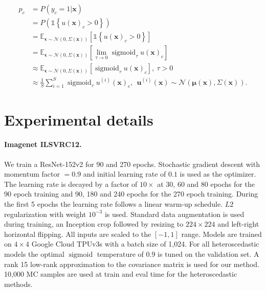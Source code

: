 \documentclass[final]{cvpr}
\DeclareMathOperator*{\sigmoid}{sigmoid}
\newcommand{\brac}[1]{\left[#1\right]}
\newcommand{\parencurly}[1]{\left\{#1\right\}}
\begin{document}
\begin{equation}
\begin{split}
    p_c &= P(y_c = 1 | \mathbf{x}) \\
    &= P(\mathds{1} \parencurly{u(\mathbf{x})_c > 0}) \\
    &= \mathbb{E}_{\boldsymbol{\epsilon} \sim \mathcal{N}(0, \Sigma(\mathbf{x}))} \brac{\mathds{1} \parencurly{u(\mathbf{x})_c > 0}} \\
    &= \mathbb{E}_{\boldsymbol{\epsilon} \sim \mathcal{N}(0, \Sigma(\mathbf{x}))} \brac{\lim_{\tau \to 0} \sigmoid_{\tau} u(\mathbf{x})_c} \\
    &\approx \mathbb{E}_{\boldsymbol{\epsilon} \sim \mathcal{N}(0, \Sigma(\mathbf{x}))} \brac{\sigmoid_{\tau} u(\mathbf{x})_c}, \ \tau > 0 \\
    &\approx \frac{1}{S} \sum_{i=1}^S \sigmoid_{\tau} u^{(i)}(\mathbf{x})_c ,\ \  \mathbf{u}^{(i)}(\mathbf{x}) \sim \mathcal{N}(\boldsymbol{\mu}(\mathbf{x}), \Sigma(\mathbf{x})).
\end{split}
\label{eq:sigmoid_mc_approx}
\end{equation}

\section{Experimental details}
\label{app:experimental_details}

\paragraph{Imagenet ILSVRC12.} We train a ResNet-152v2 \cite{he2016deep} for 90 and 270 epochs. Stochastic gradient descent with momentum factor $= 0.9$ and initial learning rate of $0.1$ is used as the optimizer. The learning rate is decayed by a factor of $10\times$ at 30, 60 and 80 epochs for the 90 epoch training and 90, 180 and 240 epochs for the 270 epoch training. During the first 5 epochs the learning rate follows a linear warm-up schedule. $L2$ regularization with weight $10^{-3}$ is used. Standard data augmentation is used during training, an Inception crop followed by resizing to $224 \times 224$ and left-right horizontal flipping. All inputs are scaled to the $[-1, 1]$ range. Models are trained on $4 \times 4$ Google Cloud TPUv3s with a batch size of 1,024. For all heteroscedastic models the optimal $\sigmoid$ temperature of $0.9$ is tuned on the validation set. A rank 15 low-rank approximation to the covariance matrix is used for our method. 10,000 MC samples are used at train and eval time for the heteroscedastic methods.
\end{document}
